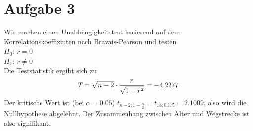 \documentclass{article}
\begin{document}
	\section*{Aufgabe 3}
	Wir machen einen Unabhängigkeitstest basierend auf dem Korrelationskoeffizinten nach Bravais-Pearson und testen \\
	$H_0$: $r=0$ \\
	$H_1$: $r\neq 0$ \\
	Die Teststatistik ergibt sich zu
	\begin{align}
		T = \sqrt{n-2}\cdot\frac{r}{\sqrt{1-r^2}} = -4.2277 \notag
	\end{align}
	Der kritische Wert ist (bei $\alpha=0.05$) $t_{n-2;1-\frac{\alpha}{2}}=t_{18;0.975} = 2.1009$, also wird die Nullhypothese abgelehnt. Der Zusammenhang zwischen Alter und Wegstrecke ist also signifikant.
\end{document}
